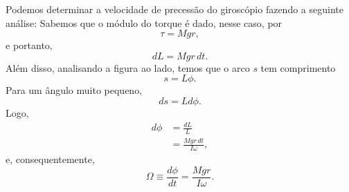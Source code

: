 Podemos determinar a velocidade de precessão do giroscópio fazendo a seguinte análise: Sabemos que o módulo do torque é dado, nesse caso, por
\begin{equation}
  \tau = Mgr,
\end{equation}
%
e portanto,
\begin{equation}
  dL = Mgr\,dt.
\end{equation}
%
Além disso, analisando a figura ao lado, temos que o arco $s$ tem comprimento
\begin{equation}
  s = L \phi.
\end{equation}
%
Para um ângulo muito pequeno,
\begin{equation}
  ds = L d\phi.
\end{equation}
%
Logo,
\begin{align}
  d\phi &= \frac{dL}{L} \\
  &= \frac{Mgr\,dt}{I\omega},
\end{align}
%
e, consequentemente,
\begin{equation}
  \Omega \equiv \frac{d\phi}{dt} = \frac{Mgr}{I\omega}.
\end{equation}






